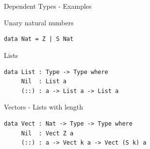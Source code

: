 \documentclass{beamer}
\begin{document}
\section{\dependentTypes}
\label{sec:dependentTypes}
\begin{frame}[fragile]{Dependent Types - Examples}
	\begin{block}{Unary natural numbers}
		 \begin{lstlisting}[basicstyle=\ttfamily\scriptsize]
data Nat = Z | S Nat
		\end{lstlisting}
	\end{block}
	
	\begin{block}{Lists}
		 \begin{lstlisting}[basicstyle=\ttfamily\scriptsize]
data List : Type -> Type where
     Nil  : List a
     (::) : a -> List a -> List a		
		\end{lstlisting}
	\end{block}
	
	\begin{block}{Vectors - Lists with length}
		 \begin{lstlisting}[basicstyle=\ttfamily\scriptsize]
data Vect : Nat -> Type -> Type where
     Nil  : Vect Z a
     (::) : a -> Vect k a -> Vect (S k) a	
		\end{lstlisting}
	\end{block}
\end{frame}
\end{document}
